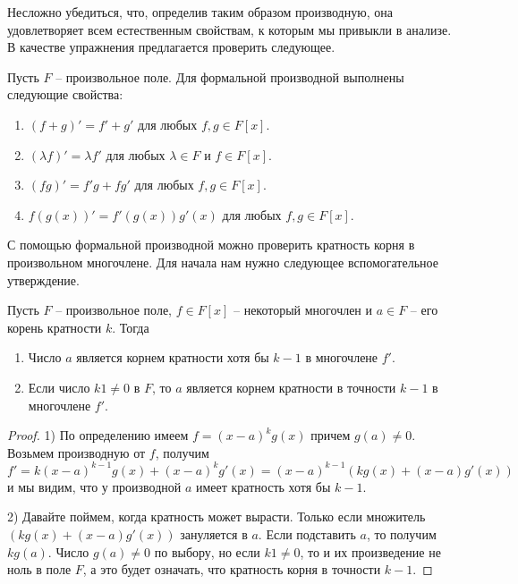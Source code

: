 Несложно убедиться, что, определив таким образом производную, она удовлетворяет всем естественным свойствам, к которым мы привыкли в анализе. В качестве упражнения предлагается проверить следующее.

\begin{claim}
Пусть $F$ -- произвольное поле. Для формальной производной выполнены следующие свойства:
\begin{enumerate}
\item $(f + g)' = f' + g'$ для любых $f,g\in F[x]$.

\item $(\lambda f )' = \lambda f'$ для любых $\lambda\in F$ и $f\in F[x]$.

\item $(fg)' = f' g + fg'$ для любых $f,g\in F[x]$.

\item $f(g(x))' = f'(g(x)) g'(x)$ для любых $f,g\in F[x]$.
\end{enumerate}
\end{claim}


С помощью формальной производной можно проверить кратность корня в произвольном многочлене. Для начала нам нужно следующее вспомогательное утверждение.

\begin{claim}
Пусть $F$ -- произвольное поле, $f\in F[x]$ -- некоторый многочлен и $a\in F$ -- его корень кратности $k$. Тогда 
\begin{enumerate}
\item Число $a$ является корнем кратности хотя бы $k-1$ в многочлене $f'$.
\item Если число $k 1 \neq 0$ в $F$, то $a$ является корнем кратности в точности $k - 1$ в многочлене $f'$.
\end{enumerate}
\end{claim}
\begin{proof}
1) По определению имеем $f = (x - a)^k g(x)$ причем $g(a) \neq 0$. Возьмем производную от $f$, получим
\[
f' = k(x-a)^{k-1}g(x) + (x-a)^k g'(x) = (x-a)^{k-1}(kg(x) + (x-a)g'(x))
\]
и мы видим, что у производной $a$ имеет кратность хотя бы $k-1$.


2) Давайте поймем, когда кратность может вырасти. Только если множитель $(kg(x) + (x-a)g'(x))$ зануляется в $a$. Если подставить $a$, то получим $kg(a)$. Число $g(a)\neq 0$ по выбору, но если $k 1\neq 0$, то и их произведение не ноль в поле $F$, а это будет означать, что кратность корня в точности $k - 1$.
\end{proof}

